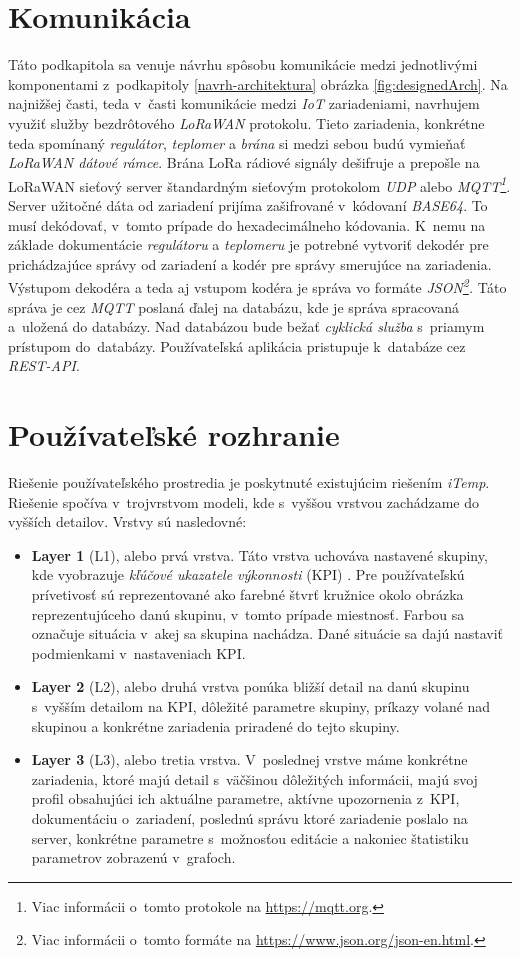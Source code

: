 \section{Komunikácia}\label{navrh-komunikacia}
Táto podkapitola sa venuje návrhu spôsobu komunikácie medzi jednotlivými komponentami z~podkapitoly \ref{navrh-architektura} obrázka \ref{fig:designedArch}. Na najnižšej časti, teda v~časti komunikácie medzi \emph{IoT} zariadeniami, navrhujem využiť služby bezdrôtového \emph{LoRaWAN} protokolu. 
Tieto zariadenia, konkrétne teda spomínaný \emph{regulátor}, \emph{teplomer} a \emph{brána} si medzi sebou budú vymieňať \emph{LoRaWAN dátové rámce}. Brána LoRa rádiové signály dešifruje a prepošle na LoRaWAN sieťový server štandardným  sieťovým protokolom \emph{UDP} alebo \emph{MQTT\footnote{Viac informácii o~tomto protokole na \url{https://mqtt.org}.}}. 
Server užitočné dáta od zariadení prijíma zašifrované v~kódovaní \emph{BASE64}. 
To musí dekódovať, v~tomto prípade do hexadecimálneho kódovania. K~nemu na základe dokumentácie \emph{regulátoru} a \emph{teplomeru} je potrebné vytvoriť dekodér pre prichádzajúce správy od zariadení a kodér pre správy smerujúce na zariadenia. 
Výstupom dekodéra a teda aj vstupom kodéra je správa vo formáte \emph{JSON\footnote{Viac informácii o~tomto formáte na \url{https://www.json.org/json-en.html}.}.}
Táto správa je cez \emph{MQTT} poslaná ďalej na databázu, kde je správa spracovaná a~uložená do databázy. 
Nad databázou bude bežať \emph{cyklická služba} s~priamym prístupom do~databázy.
Používateľská aplikácia pristupuje k~databáze cez \emph{REST-API}.

\section{Používateľské rozhranie}
Riešenie používateľského prostredia je poskytnuté existujúcim riešením \emph{iTemp}.
Riešenie spočíva v~trojvrstvom modeli, kde s~vyššou vrstvou zachádzame do vyšších detailov. Vrstvy sú nasledovné:
\begin{itemize}
    \item \textbf{Layer 1} (L1), alebo prvá vrstva. Táto vrstva uchováva nastavené skupiny, kde vyobrazuje \textit{kľúčové ukazatele výkonnosti} (KPI) \cite{eckerson2010performance}. Pre používateľskú prívetivosť sú reprezentované ako farebné štvrť kružnice okolo obrázka reprezentujúceho danú skupinu, v~tomto prípade miestnosť. Farbou sa označuje situácia v~akej sa skupina nachádza. Dané situácie sa dajú nastaviť podmienkami v~nastaveniach KPI.
    \item \textbf{Layer 2} (L2), alebo druhá vrstva ponúka bližší detail na danú skupinu s~vyšším detailom na KPI, dôležité parametre skupiny, príkazy volané nad skupinou a konkrétne zariadenia priradené do tejto skupiny.
    \item \textbf{Layer 3} (L3), alebo tretia vrstva. V~poslednej vrstve máme konkrétne zariadenia, ktoré majú detail s~väčšinou dôležitých informácii, majú svoj profil obsahujúci ich aktuálne parametre, aktívne upozornenia z~KPI, dokumentáciu o~zariadení, poslednú správu ktoré zariadenie poslalo na server, konkrétne parametre s~možnosťou editácie a nakoniec štatistiku parametrov zobrazenú v~grafoch.
\end{itemize}